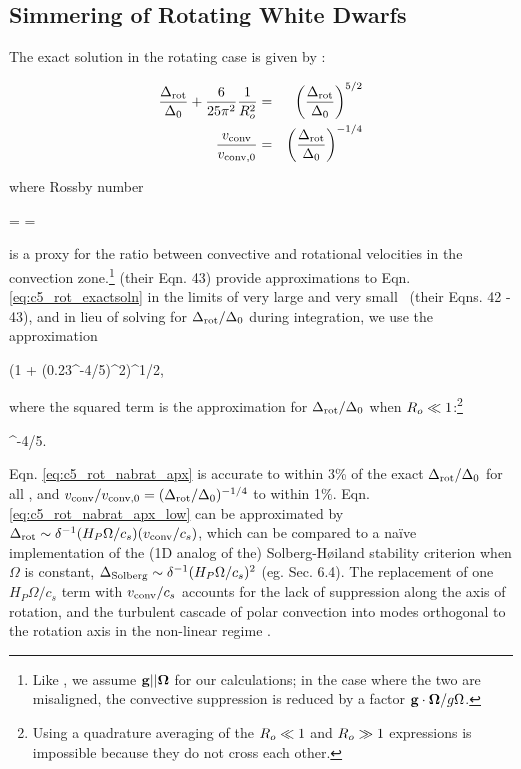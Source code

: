 \subsection{Simmering of Rotating White Dwarfs}
\label{ssec:c5_runaway_rot}

The exact solution in the rotating case is given by \citeal{stev79}:

\begin{eqnarray}
\frac{\dnabrot}{\dnabconvzero} + \frac{6}{25\pi^2}\frac{1}{\rossby^2} &=& \left(\frac{\dnabrot}{\dnabconvzero}\right)^{5/2} \nonumber \\
\frac{\vconv}{\vconvzero} &=& \left(\frac{\dnabrot}{\dnabconvzero}\right)^{-1/4}
\label{eq:c5_rot_exactsoln}
\end{eqnarray}

\noindent where Rossby number

\eqbegin
\rossby =  = 
\label{eq:c5_rossbynumber}
\eqend

\noindent is a proxy for the ratio between convective and rotational velocities in the convection zone.\footnote{Like \cite{barkdl14}, we assume ${\bf g}||\boldsymbol{\Omega}$ for our calculations; in the case where the two are misaligned, the convective suppression is reduced by a factor ${\bf g}\cdot \boldsymbol{\Omega}/g\Omega$.}  \citeal{stev79} (their Eqn. 43) provide approximations to Eqn. \ref{eq:c5_rot_exactsoln} in the limits of very large and very small \rossby\ (their Eqns. 42 - 43), and in lieu of solving for $\dnabrot/\dnabconvzero$ during integration, we use the approximation

\eqbegin
\frac{\dnabrot}{\dnabconvzero} \approx \left(1 + \left(0.23\rossby^{-4/5}\right)^2\right)^{1/2},
\label{eq:c5_rot_nabrat_apx}
\eqend

\noindent where the squared term is the \citeal{stev79} approximation for $\dnabrot/\dnabconvzero$ when $\rossby \ll 1$:\footnote{Using a quadrature averaging of the \citeal{stev79} $\rossby \ll 1$ and $\rossby \gg 1$ expressions is impossible because they do not cross each other.}

\eqbegin
\frac{\dnabrot}{\dnabconvzero}  \rossby^{-4/5}.
\label{eq:c5_rot_nabrat_apx_low}
\eqend

\noindent Eqn. \ref{eq:c5_rot_nabrat_apx} is accurate to within 3\% of the exact $\dnabrot/\dnabconvzero$ for all \rossby, and $\vconv/\vconvzero = (\dnabrot/\dnabconvzero)^{-1/4}$ to within 1\%.  Eqn. \ref{eq:c5_rot_nabrat_apx_low} can be approximated by $\dnabrot \sim \delta^{-1}(H_P\Omega/c_s)(\vconv/c_s)$, which can be compared to a na\"{i}ve implementation of the (1D analog of the) Solberg-H{\o}iland stability criterion when $\Omega$ is constant, $\Delta_\mathrm{Solberg} \sim \delta^{-1}(H_P\Omega/c_s)^2$ (eg. \citealt{maed09} Sec. 6.4).  The replacement of one $H_P\Omega/c_s$ term with $\vconv/c_s$ accounts for the lack of suppression along the axis of rotation, and the turbulent cascade of polar convection into modes orthogonal to the rotation axis in the non-linear regime \citep{barkdl14}.

